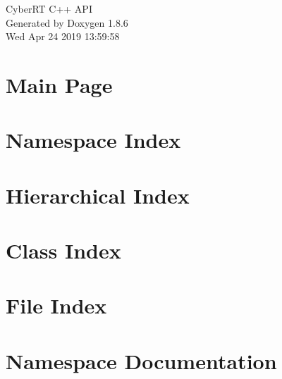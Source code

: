 \documentclass[twoside]{book}
\newcommand{\clearemptydoublepage}{%
  \newpage{\pagestyle{empty}\cleardoublepage}%
}
\begin{document}
\hypersetup{pageanchor=false}
\begin{titlepage}
\vspace*{7cm}
\begin{center}%
{\Large Cyber\-R\-T C++ A\-P\-I }\\
\vspace*{1cm}
{\large Generated by Doxygen 1.8.6}\\
\vspace*{0.5cm}
{\small Wed Apr 24 2019 13:59:58}\\
\end{center}
\end{titlepage}
\clearemptydoublepage
\tableofcontents
\clearemptydoublepage
{}
\hypersetup{pageanchor=true}

\chapter{Main Page}
\label{index}\hypertarget{index}{}
\chapter{Namespace Index}

\chapter{Hierarchical Index}

\chapter{Class Index}

\chapter{File Index}

\chapter{Namespace Documentation}






























\end{document}
